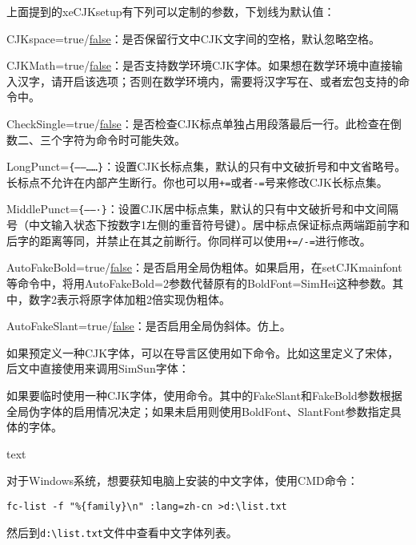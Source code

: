 上面提到的xeCJKsetup有下列可以定制的参数，下划线为默认值：
\begin{feai}
\item CJKspace=true/\uline{false}：是否保留行文中CJK文字间的空格，默认忽略空格。
\item CJKMath=true/\uline{false}：是否支持数学环境CJK字体。如果想在数学环境中直接输入汉字，请开启该选项；否则在数学环境内，需要将汉字写在、或者宏包支持的命令中。
\item CheckSingle=true/\uline{false}：是否检查CJK标点单独占用段落最后一行。此检查在倒数二、三个字符为命令时可能失效。
\item LongPunct=\verb|{——……}|：设置CJK长标点集，默认的只有中文破折号和中文省略号。长标点不允许在内部产生断行。你也可以用\texttt{+=}或者\texttt{-=}号来修改CJK长标点集。
\item MiddlePunct=\verb|{——·}|：设置CJK居中标点集，默认的只有中文破折号和中文间隔号（中文输入状态下按数字1左侧的重音符号键）。居中标点保证标点两端距前字和后字的距离等同，并禁止在其之前断行。你同样可以使用\texttt{+=/-=}进行修改。
\item AutoFakeBold=true/\uline{false}：是否启用全局伪粗体。如果启用，在setCJKmainfont等命令中，将用AutoFakeBold=2参数代替原有的BoldFont=SimHei这种参数。其中，数字2表示将原字体加粗2倍实现伪粗体。
\item AutoFakeSlant=true/\uline{false}：是否启用全局伪斜体。仿上。
\end{feai}

如果预定义一种CJK字体，可以在导言区使用如下命令。比如这里定义了宋体，后文中直接使用来调用SimSun字体：
\begin{latex}
\newCJKfontfamily[song]
\end{latex}

如果要临时使用一种CJK字体，使用命令。其中的FakeSlant和FakeBold参数根据全局伪字体的启用情况决定；如果未启用则使用BoldFont、SlantFont参数指定具体的字体。
\begin{latex}
{ text}
\end{latex}

对于Windows系统，想要获知电脑上安装的中文字体，使用CMD命令：
\begin{verbatim}
fc-list -f "%{family}\n" :lang=zh-cn >d:\list.txt
\end{verbatim}

然后到\verb|d:\list.txt|文件中查看中文字体列表。

